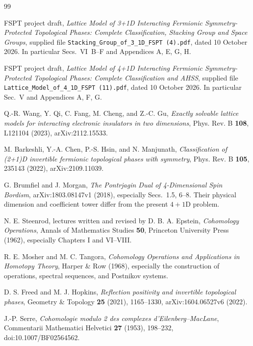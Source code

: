 \begin{thebibliography}{99}

 FSPT project draft, \emph{Lattice Model of 3+1D Interacting Fermionic Symmetry-Protected Topological Phases: Complete Classification, Stacking Group and Space Groups}, supplied file \texttt{Stacking\_Group\_of\_3\_1D\_FSPT (4).pdf}, dated 10 October 2026. In particular Secs.~VI~B--F and Appendices A, E, G, H.

 FSPT project draft, \emph{Lattice Model of 4+1D Interacting Fermionic Symmetry-Protected Topological Phases: Complete Classification and AHSS}, supplied file \texttt{Lattice\_Model\_of\_4\_1D\_FSPT (11).pdf}, dated 10 October 2026. In particular Sec.~V and Appendices A, F, G.

 Q.-R. Wang, Y. Qi, C. Fang, M. Cheng, and Z.-C. Gu, \emph{Exactly solvable lattice models for interacting electronic insulators in two dimensions}, Phys. Rev. B \textbf{108}, L121104 (2023), arXiv:2112.15533.

 M. Barkeshli, Y.-A. Chen, P.-S. Hsin, and N. Manjunath, \emph{Classification of (2+1)D invertible fermionic topological phases with symmetry}, Phys. Rev. B \textbf{105}, 235143 (2022), arXiv:2109.11039.

 G. Brumfiel and J. Morgan, \emph{The Pontrjagin Dual of 4-Dimensional Spin Bordism}, arXiv:1803.08147v1 (2018), especially Secs.~1.5, 6--8. Their physical dimension and coefficient tower differ from the present $4+1$D problem.

 N. E. Steenrod, lectures written and revised by D. B. A. Epstein, \emph{Cohomology Operations}, Annals of Mathematics Studies \textbf{50}, Princeton University Press (1962), especially Chapters I and VI--VIII.

 R. E. Mosher and M. C. Tangora, \emph{Cohomology Operations and Applications in Homotopy Theory}, Harper \& Row (1968), especially the construction of operations, spectral sequences, and Postnikov systems.

 D. S. Freed and M. J. Hopkins, \emph{Reflection positivity and invertible topological phases}, Geometry \& Topology \textbf{25} (2021), 1165--1330, arXiv:1604.06527v6 (2022).

 J.-P. Serre, \emph{Cohomologie modulo 2 des complexes d'Eilenberg--MacLane}, Commentarii Mathematici Helvetici \textbf{27} (1953), 198--232, doi:10.1007/BF02564562.


\end{thebibliography}
